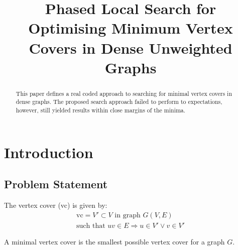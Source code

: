 \documentclass[conference,letterpaper]{IEEEtran}
\begin{document}
\title{Phased Local Search for Optimising Minimum Vertex Covers in Dense Unweighted Graphs}
\author{
}

\maketitle

\begin{abstract}
    This paper defines a real coded approach to searching for minimal vertex covers in dense graphs. The proposed search approach failed to perform to expectations, however, still yielded results within close margins of the minima.
\end{abstract}

%
%   
\section{Introduction}
\subsection{Problem Statement}
\par The vertex cover (vc) is given by:
\begin{equation}
    \begin{split}
        \mbox{vc} = V\prime \subset V \mbox{ in graph } G(V,E) \\
        \mbox{such that } uv \in E \Rightarrow u \in V\prime \lor v \in V\prime
    \end{split}
\end{equation}
\par A minimal vertex cover is the smallest possible vertex cover for a graph $G$.
\end{document}
